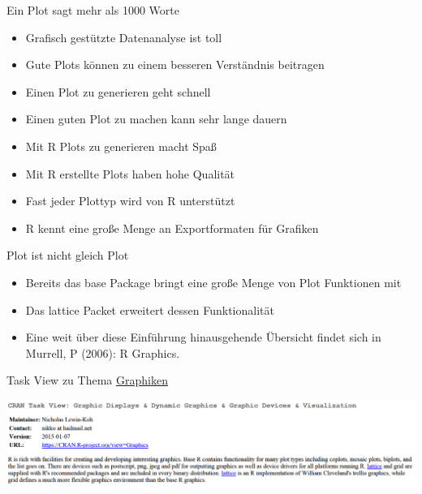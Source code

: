 \documentclass[ignorenonframetext,]{beamer}
\providecommand{\tightlist}{%
\setlength{\itemsep}{0pt}\setlength{\parskip}{0pt}}
\begin{document}
\begin{frame}{Ein Plot sagt mehr als 1000 Worte}

\begin{itemize}
\tightlist
\item
  Grafisch gestützte Datenanalyse ist toll
\item
  Gute Plots können zu einem besseren Verständnis beitragen
\item
  Einen Plot zu generieren geht schnell
\item
  Einen guten Plot zu machen kann sehr lange dauern
\item
  Mit R Plots zu generieren macht Spaß
\item
  Mit R erstellte Plots haben hohe Qualität
\item
  Fast jeder Plottyp wird von R unterstützt
\item
  R kennt eine große Menge an Exportformaten für Grafiken
\end{itemize}

\end{frame}

\begin{frame}{Plot ist nicht gleich Plot}

\begin{itemize}
\tightlist
\item
  Bereits das base Package bringt eine große Menge von Plot Funktionen
  mit
\item
  Das lattice Packet erweitert dessen Funktionalität
\item
  Eine weit über diese Einführung hinausgehende Übersicht findet sich in
  Murrell, P (2006): R Graphics.
\end{itemize}

\end{frame}

\begin{frame}{Task View zu Thema
\href{https://cran.r-project.org/web/views/Graphics.html}{Graphiken}}

\includegraphics{./tex2pdf.956/5e4adb82cb6141da7bafecd33dfdc7d0e44f95dc.png}

\end{frame}
\end{document}
